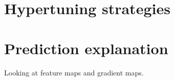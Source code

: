 \section{Hypertuning strategies}

\section{Prediction explanation}
Looking at feature maps and gradient maps.



